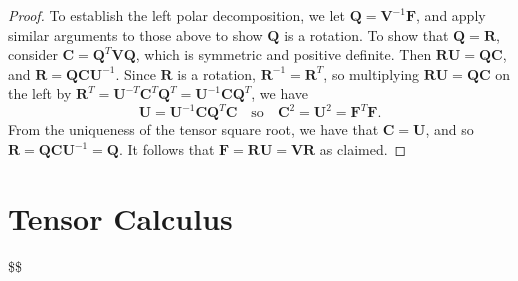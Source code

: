 \documentclass[
  letterpaper,
  DIV=11,
  numbers=noendperiod]{scrreprt}
\theoremstyle{plain}
\theoremstyle{remark}
\begin{document}
\begin{proof}
To establish the left polar decomposition, we let
\({\boldsymbol{Q}}={\boldsymbol{V}}^{-1}{\boldsymbol{F}}\), and apply
similar arguments to those above to show \({\boldsymbol{Q}}\) is a
rotation. To show that \({\boldsymbol{Q}}={\boldsymbol{R}}\), consider
\({\boldsymbol{C}}={\boldsymbol{Q}}^T{\boldsymbol{V}}{\boldsymbol{Q}}\),
which is symmetric and positive definite. Then
\({\boldsymbol{R}}{\boldsymbol{U}}={\boldsymbol{Q}}{\boldsymbol{C}}\),
and
\({\boldsymbol{R}}={\boldsymbol{Q}}{\boldsymbol{C}}{\boldsymbol{U}}^{-1}\).
Since \({\boldsymbol{R}}\) is a rotation,
\({\boldsymbol{R}}^{-1}={\boldsymbol{R}}^T\), so multiplying
\({\boldsymbol{R}}{\boldsymbol{U}}={\boldsymbol{Q}}{\boldsymbol{C}}\) on
the left by
\({\boldsymbol{R}}^T={\boldsymbol{U}}^{-T}{\boldsymbol{C}}^T{\boldsymbol{Q}}^T={\boldsymbol{U}}^{-1}{\boldsymbol{C}}{\boldsymbol{Q}}^T\),
we have
\[{\boldsymbol{U}}= {\boldsymbol{U}}^{-1}{\boldsymbol{C}}{\boldsymbol{Q}}^T{\boldsymbol{C}}\quad\text{so}\quad{\boldsymbol{C}}^2={\boldsymbol{U}}^2={\boldsymbol{F}}^T{\boldsymbol{F}}.\]
From the uniqueness of the tensor square root, we have that
\({\boldsymbol{C}}={\boldsymbol{U}}\), and so
\({\boldsymbol{R}}= {\boldsymbol{Q}}{\boldsymbol{C}}{\boldsymbol{U}}^{-1}={\boldsymbol{Q}}\).
It follows that
\({\boldsymbol{F}}={\boldsymbol{R}}{\boldsymbol{U}}={\boldsymbol{V}}{\boldsymbol{R}}\)
as claimed.
\end{proof}


\chapter{Tensor Calculus}\label{sec-tensor-calculus}

\$\$ \newcommand{\bfa}{{\boldsymbol{a}}}
\newcommand{\bfb}{{\boldsymbol{b}}} \newcommand{\bfc}{{\boldsymbol{c}}}
\newcommand{\bfd}{{\boldsymbol{d}}} \newcommand{\bfe}{{\boldsymbol{e}}}
\newcommand{\bff}{{\boldsymbol{f}}} \newcommand{\bfg}{{\boldsymbol{g}}}
\newcommand{\bfh}{{\boldsymbol{h}}} \newcommand{\bfi}{{\boldsymbol{i}}}
\newcommand{\bfj}{{\boldsymbol{j}}} \newcommand{\bfk}{{\boldsymbol{k}}}
\newcommand{\bfl}{{\boldsymbol{l}}} \newcommand{\bfm}{{\boldsymbol{m}}}
\newcommand{\bfn}{{\boldsymbol{n}}} \newcommand{\bfo}{{\boldsymbol{o}}}
\newcommand{\bfp}{{\boldsymbol{p}}} \newcommand{\bfq}{{\boldsymbol{q}}}
\newcommand{\bfr}{{\boldsymbol{r}}} \newcommand{\bfs}{{\boldsymbol{s}}}
\newcommand{\bft}{{\boldsymbol{t}}} \newcommand{\bfu}{{\boldsymbol{u}}}
\newcommand{\bfv}{{\boldsymbol{v}}} \newcommand{\bfw}{{\boldsymbol{w}}}
\newcommand{\bfx}{{\boldsymbol{x}}} \newcommand{\bfy}{{\boldsymbol{y}}}
\newcommand{\bfz}{{\boldsymbol{z}}}
\end{document}
